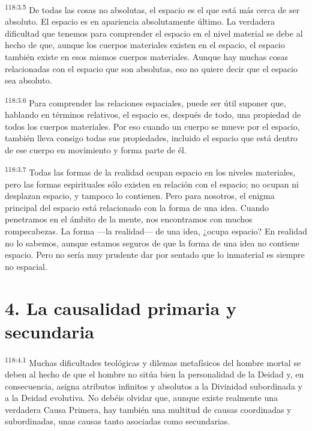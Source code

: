 \par
\textsuperscript{118:3.5} De todas las cosas no absolutas, el espacio es el que está más cerca de ser absoluto. El espacio es en apariencia absolutamente último. La verdadera dificultad que tenemos para comprender el espacio en el nivel material se debe al hecho de que, aunque los cuerpos materiales existen en el espacio, el espacio también existe en esos mismos cuerpos materiales. Aunque hay muchas cosas relacionadas con el espacio que son absolutas, eso no quiere decir que el espacio sea absoluto.

\par
\textsuperscript{118:3.6} Para comprender las relaciones espaciales, puede ser útil suponer que, hablando en términos relativos, el espacio es, después de todo, una propiedad de todos los cuerpos materiales. Por eso cuando un cuerpo se mueve por el espacio, también lleva consigo todas sus propiedades, incluido el espacio que está dentro de ese cuerpo en movimiento y forma parte de él.

\par
\textsuperscript{118:3.7} Todas las formas de la realidad ocupan espacio en los niveles materiales, pero las formas espirituales sólo existen en relación con el espacio; no ocupan ni desplazan espacio, y tampoco lo contienen. Pero para nosotros, el enigma principal del espacio está relacionado con la forma de una idea. Cuando penetramos en el ámbito de la mente, nos encontramos con muchos rompecabezas. La forma ---la realidad--- de una idea, ¿ocupa espacio? En realidad no lo sabemos, aunque estamos seguros de que la forma de una idea no contiene espacio. Pero no sería muy prudente dar por sentado que lo inmaterial es siempre no espacial.

\section*{4. La causalidad primaria y secundaria}
\par
\textsuperscript{118:4.1} Muchas dificultades teológicas y dilemas metafísicos del hombre mortal se deben al hecho de que el hombre no sitúa bien la personalidad de la Deidad y, en consecuencia, asigna atributos infinitos y absolutos a la Divinidad subordinada y a la Deidad evolutiva. No debéis olvidar que, aunque existe realmente una verdadera Causa Primera, hay también una multitud de causas coordinadas y subordinadas, unas causas tanto asociadas como secundarias.

